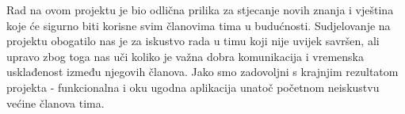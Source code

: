 		Rad na ovom projektu je bio odlična prilika za stjecanje novih znanja i vještina koje će sigurno biti korisne svim članovima tima u budućnosti. Sudjelovanje na projektu obogatilo nas je za iskustvo rada u timu koji nije uvijek savršen, ali upravo zbog toga nas uči koliko je važna dobra komunikacija i vremenska usklađenost između njegovih članova. Jako smo zadovoljni s krajnjim rezultatom projekta - funkcionalna i oku ugodna aplikacija unatoč početnom neiskustvu većine članova tima. 
		